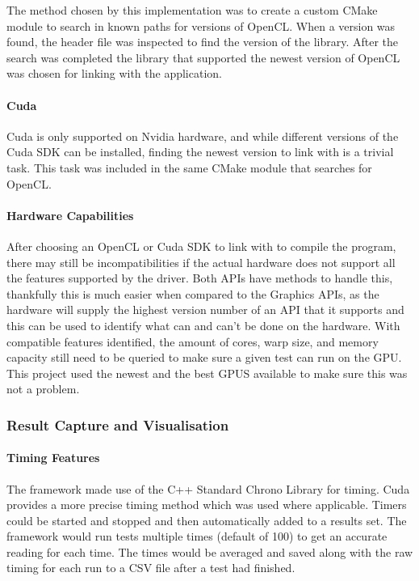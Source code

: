 \documentclass[12pt,a4paper]{article}
\begin{document}
The method chosen by this implementation was to create a custom CMake module to search in known paths for versions of OpenCL. When a version was found, the header file was inspected to find the version of the library. After the search was completed the library that supported the newest version of OpenCL was chosen for linking with the application.
\paragraph{Cuda}
Cuda is only supported on Nvidia hardware, and while different versions of the Cuda SDK can be installed, finding the newest version to link with is a trivial task. This task was included in the same CMake module that searches for OpenCL. 

\paragraph{Hardware Capabilities}
After choosing an OpenCL or Cuda SDK to link with to compile the program, there may still be incompatibilities if the actual hardware does not support all the features supported by the driver. Both APIs have methods to handle this, thankfully this is much easier when compared to the Graphics APIs, as the hardware will supply the highest version number of an API that it supports and this can be used to identify what can and can’t be done on the hardware.
With compatible features identified, the amount of cores, warp size, and memory capacity still need to be queried to make sure a given test can run on the GPU. This project used the newest and the best GPUS available to make sure this was not a problem.

\subsubsection{Result Capture and Visualisation}
\paragraph{Timing Features}
The framework made use of the C++ Standard Chrono Library for timing. Cuda provides a more precise timing method which was used where applicable. Timers could be started and stopped and then automatically added to a results set. The framework would run tests multiple times (default of 100) to get an accurate reading for each time. The times would be averaged and saved along with the raw timing for each run to a CSV file after a test had finished.
\end{document}
